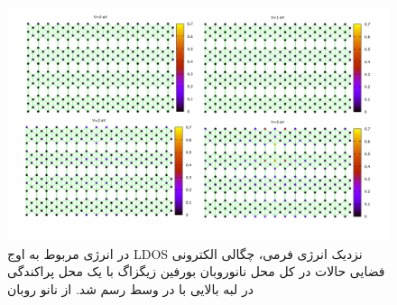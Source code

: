 \begin{figure}[!ht]
  \centering
  \includegraphics[width=1\linewidth]{./figures/Slide1.PNG}
  \caption{در انرژی مربوط به اوج \gls{LDOS} نزدیک انرژی فر‌می‌، چگالی الکترونی فضایی حالات در کل محل نانوروبان ‌بورفین زیگزاگ با یک محل پراکندگی در لبه بالایی با  در وسط رسم شد. از نانو روبان}
  \label{zigCSLDOS}
\end{figure}


